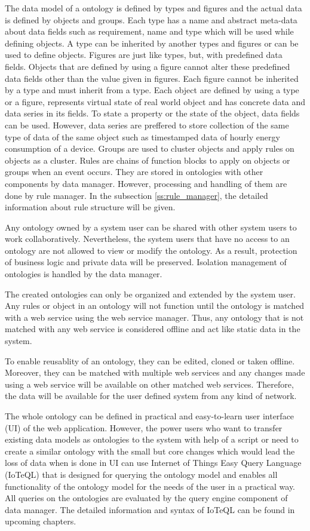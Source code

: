 The data model of a ontology is defined by types and figures and the actual data is defined by objects and groups. Each type has a name and abstract meta-data about data fields such as requirement, name and type which will be used while defining objects. A type can be inherited by another types and figures or can be used to define objects. Figures are just like types, but, with predefined data fields. Objects that are defined by using a figure cannot alter these predefined data fields other than the value given in figures. Each figure cannot be inherited by a type and must inherit from a type. Each object are defined by using a type or a figure, represents virtual state of real world object and has concrete data and data series in its fields. To state a property or the state of the object, data fields can be used. However, data series are preffered to store collection of the same type of data of the same object such as timestamped data of hourly energy consumption of a device. Groups are used to cluster objects and apply rules on objects as a cluster. Rules are chains of function blocks to apply on objects or groups when an event occurs. They are stored in ontologies with other components by data manager. However, processing and handling of them are done by rule manager. In the subsection \ref{ss:rule_manager}, the detailed information about rule structure will be given.

Any ontology owned by a system user can be shared with other system users to work collaboratively. Nevertheless, the system users that have no access to an ontology are not allowed to view or modify the ontology. As a result, protection of business logic and private data will be preserved. Isolation management of ontologies is handled by the data manager. 

The created ontologies can only be organized and extended by the system user. Any rules or object in an ontology will not function until the ontology is matched with a web service using the web service manager. Thus, any ontology that is not matched with any web service is considered offline and act like static data in the system.

To enable reusablity of an ontology, they can be edited, cloned or taken offline. Moreover, they can be matched with multiple web services and any changes made using a web service will be available on other matched web services. Therefore, the data will be available for the user defined system from any kind of network.

The whole ontology can be defined in practical and easy-to-learn user interface (UI) of the web application. However, the power users who want to transfer existing data models as ontologies to the system with help of a script or need to create a similar ontology with the small but core changes which would lead the loss of data when is done in UI can use Internet of Things Easy Query Language (IoTeQL) that is designed for querying the ontology model and enables all functionality of the ontology model for the needs of the user in a practical way. All queries on the ontologies are evaluated by the query engine component of data manager. The detailed information and syntax of IoTeQL can be found in upcoming chapters. %

